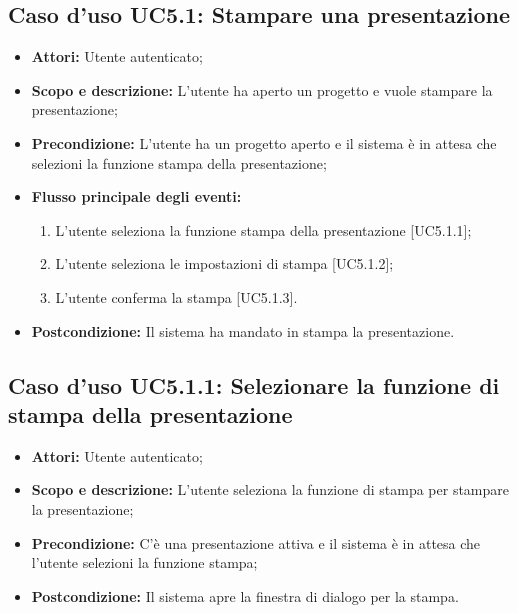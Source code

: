 	\subsection{Caso d'uso UC5.1: Stampare una presentazione}
	\begin{itemize}
		\item \textbf{Attori:} Utente autenticato;
		\item \textbf{Scopo e descrizione:} L'utente ha aperto un progetto e vuole stampare la presentazione;
		\item \textbf{Precondizione:} L'utente ha un progetto aperto e il sistema è in attesa che selezioni la funzione stampa della presentazione;
		\item \textbf{Flusso principale degli eventi:}
		\begin{enumerate}
			\item L'utente seleziona la funzione stampa della presentazione [UC5.1.1];
			\item L'utente seleziona le impostazioni di stampa [UC5.1.2];
			\item L'utente conferma la stampa [UC5.1.3].
		\end{enumerate}
		\item \textbf{Postcondizione:} Il sistema ha mandato in stampa la presentazione.
	\end{itemize}
	\newpage
	
	\subsection{Caso d'uso UC5.1.1: Selezionare la funzione di stampa della presentazione}
	\begin{itemize}
		\item \textbf{Attori:} Utente autenticato;
		\item \textbf{Scopo e descrizione:} L'utente seleziona la funzione di stampa per stampare la presentazione;
		\item \textbf{Precondizione:} C'è una presentazione attiva e il sistema è in attesa che l'utente selezioni la funzione stampa;
		\item \textbf{Postcondizione:} Il sistema apre la finestra di dialogo per la stampa.
	\end{itemize}
	
